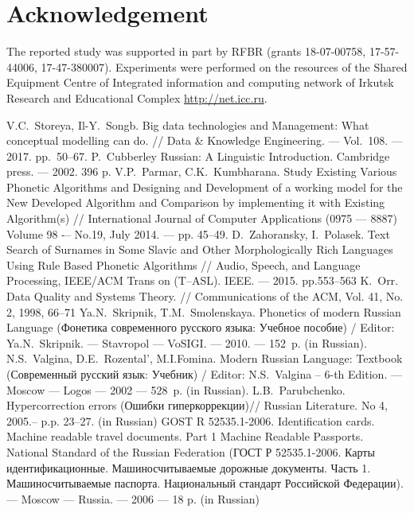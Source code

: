 \documentclass{svproc}
\begin{document}
\section*{Acknowledgement}
The reported study was supported in part by RFBR (grants 18-07-00758, 17-57-44006, 17-47-380007). Experiments were performed on the resources of the Shared Equipment Centre of Integrated information and computing network of Irkutsk Research and Educational Complex \url{http://net.icc.ru}.






\begin{thebibliography}{18}

 V.C.~Storeya, Il-Y.~Songb. Big data technologies and Management: What conceptual modelling can do. // Data \& Knowledge Engineering. --- Vol.~108. --- 2017. pp.~50--67.
 P.~Cubberley Russian: A Linguistic Introduction. Cambridge press. --– 2002. 396 p.
	V.P.~Parmar, C.K.~Kumbharana. Study Existing Various Phonetic Algorithms and Designing and Development of a working model for the New Developed Algorithm and Comparison by implementing it with Existing Algorithm(s) // International Journal of Computer Applications (0975 –-- 8887) Volume 98 -– No.19, July 2014. --– pp. 45--49.
 D.~Zahoransky, I.~Polasek. Text Search of Surnames in Some Slavic and Other Morphologically Rich Languages Using Rule Based Phonetic Algorithms // Audio, Speech, and Language Processing, IEEE/ACM Trans on (T--ASL). IEEE. --- 2015. pp.553--563
 K.~Orr. Data Quality and Systems Theory. // Communications of the ACM, Vol. 41, No. 2, 1998, 66--71
 Ya.N.~Skripnik, T.M.~Smolenskaya. Phonetics of modern Russian Language (Фонетика современного русского языка: Учебное пособие) / Editor: Ya.N.~Skripnik. --- Stavropol --- VoSIGI. --- 2010. --- 152~p. (in Russian).
 N.S.~Valgina, D.E.~Rozental', M.I.Fomina. Modern Russian Language: Textbook (Современный русский язык: Учебник) / Editor: N.S.~Valgina -- 6-th Edition. --- Moscow --- Logos --- 2002 --- 528~p. (in Russian).
 L.B.~Parubchenko. Hypercorrection errors (Ошибки гиперкоррекции)// Russian Literature. No 4, 2005.-- p.p. 23--27. (in Russian)
 GOST R 52535.1-2006. Identification cards. Machine readable travel documents. Part 1 Machine Readable Passports. National Standard of the Russian Federation (ГОСТ Р 52535.1-2006. Карты идентификационные. Машиносчитываемые дорожные документы. Часть 1. Машиносчитываемые паспорта. Национальный стандарт Российской Федерации). --- Moscow --- Russia. --- 2006 --- 18 p. (in Russian)

\end{thebibliography}
\end{document}
